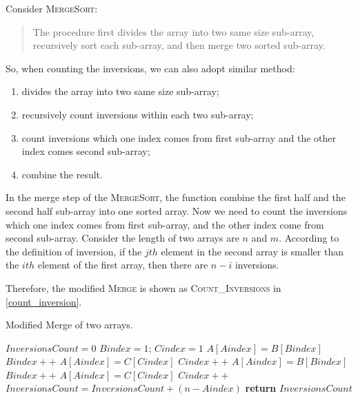 \begin{homeworkProblem}

Consider \textsc{MergeSort}:

\begin{quote}
    The procedure first divides the array into two same size sub-array, recursively
    sort each sub-array, and then merge two sorted sub-array.
\end{quote}

So, when counting the inversions, we can also adopt similar method:
\begin{enumerate}
\item divides the array into two same size sub-array;
\item recursively count inversions within each two sub-array;
\item count inversions which one index comes from first sub-array and the other index comes
second sub-array;
\item combine the result.
\end{enumerate}

In the merge step of the \textsc{MergeSort}, the function combine the first half
and the second half sub-array into one sorted array. Now we need to count the 
inversions which one index comes from first sub-array, and the other index come
from second sub-array. Consider the length of two arrays are $n$ and $m$.
According to the definition of inversion, if the $jth$ element in the second
array is smaller than the $ith$ element of the first array, then there are $n - i$
inversions.

Therefore, the modified \textsc{Merge} is shown as \textsc{Count\_Inversions} in \cref{count_inversion}.

\begin{algorithm}[H]
    \caption{Modified Merge of two arrays.} \label{count_inversion}
    \begin{algorithmic}[1]
        \State$InversionsCount = 0$
        \State$Bindex = 1$; $Cindex = 1$
             
                \State $A[Aindex]= B[Bindex]$
                \State $Bindex++$
             
                \State $A[Aindex] = C[Cindex]$
                \State $Cindex++$
             
                \State $A[Aindex] = B[Bindex]$
                \State $Bindex++$
            \Else {}
                \State $A[Aindex] = C[Cindex]$
                \State $Cindex++$
                \State $InversionsCount = InversionsCount + (n - Aindex)$
            \EndIf
        \EndFor
        \State \textbf{return } $InversionsCount$
        \EndProcedure
    \end{algorithmic}
\end{algorithm}


\end{homeworkProblem}
